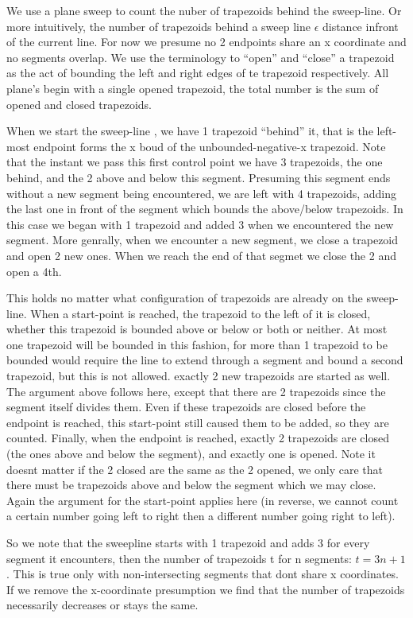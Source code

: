 \documentclass{article}
\begin{document}
We use a plane sweep to count the nuber of trapezoids behind the sweep-line.
Or more intuitively, the number of trapezoids behind a sweep line $\epsilon$ distance infront of the current line.
For now we presume no 2 endpoints share an x coordinate and no segments overlap.
We use the terminology to ``open'' and ``close'' a trapezoid as the act of bounding the left and right edges of te trapezoid respectively.
All plane's begin with a single opened trapezoid, the total number is the sum of opened and closed trapezoids.

When we start the sweep-line , we have 1 trapezoid ``behind'' it, that is the left-most endpoint forms the x boud of the unbounded-negative-x trapezoid.
Note that the instant we pass this first control point we have 3 trapezoids, the one behind, and the 2 above and below this segment.
Presuming this segment ends without a new segment being encountered, we are left with 4 trapezoids, adding the last one in front of the segment which bounds the above/below trapezoids.
In this case we began with 1 trapezoid and added 3 when we encountered the new segment.
More genrally, when we encounter a new segment, we close a trapezoid and open 2 new ones.
When we reach the end of that segmet we close the 2 and open a 4th.

This holds no matter what configuration of trapezoids are already on the sweep-line.
When a start-point is reached, the trapezoid to the left of it is closed, whether this trapezoid is bounded above or below or both or neither.
At most one trapezoid will be bounded in this fashion, for more than 1 trapezoid to be bounded would require the line to extend through a segment and bound a second trapezoid, but this is not allowed.
exactly 2 new trapezoids are started as well.
The argument above follows here, except that there are 2 trapezoids since the segment itself divides them.
Even if these trapezoids are closed before the endpoint is reached, this start-point still caused them to be added, so they are counted.
Finally, when the endpoint is reached, exactly 2 trapezoids are closed (the ones above and below the segment), and exactly one is opened.
Note it doesnt matter if the 2 closed are the same as the 2 opened, we only care that there must be trapezoids above and below the segment which we may close.
Again the argument for the start-point applies here (in reverse, we cannot count a certain number going left to right then a different number going right to left).

So we note that the sweepline starts with 1 trapezoid and adds 3 for every segment it encounters, then the number of trapezoids t for n segments: $t = 3n + 1$.
This is true only with non-intersecting segments that dont share x coordinates.
If we remove the x-coordinate presumption we find that the number of trapezoids necessarily decreases or stays the same.
\end{document}
